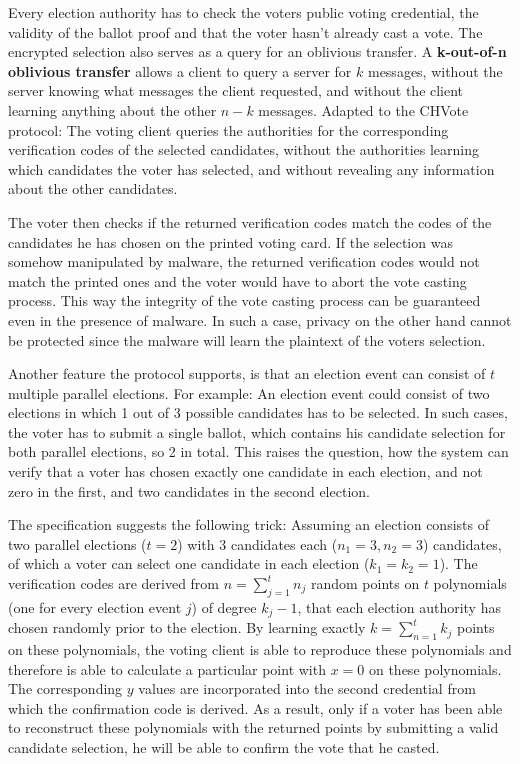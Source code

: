 Every election authority has to check the voters public voting credential, the validity of the ballot proof and that the voter hasn't already cast a vote. The encrypted selection also serves as a query for an oblivious transfer. A \textbf{k-out-of-n oblivious transfer} allows a client to query a server for $k$ messages, without the server knowing what messages the client requested, and without the client learning anything about the other $n-k$ messages. Adapted to the CHVote protocol: The voting client queries the authorities for the corresponding verification codes of the selected candidates, without the authorities learning which candidates the voter has selected, and without revealing any information about the other candidates. 

The voter then checks if the returned verification codes match the codes of the candidates he has chosen on the printed voting card. If the selection was somehow manipulated by malware, the returned verification codes would not match the printed ones and the voter would have to abort the vote casting process. This way the integrity of the vote casting process can be guaranteed even in the presence of malware. In such a case, privacy on the other hand cannot be protected since the malware will learn the plaintext of the voters selection.

Another feature the protocol supports, is that an election event can consist of $t$ multiple parallel elections. For example: An election event could consist of two elections in which 1 out of 3 possible candidates has to be selected. In such cases, the voter has to submit a single ballot, which contains his candidate selection for both parallel elections, so 2 in total. This raises the question, how the system can verify that a voter has chosen exactly one candidate in each election, and not zero in the first, and two candidates in the second election.

The specification suggests the following trick: Assuming an election consists of two parallel elections ($t=2$) with 3 candidates each ($n_1 = 3, n_2 = 3$) candidates, of which a voter can select one candidate in each election ($k_1 = k_2 =1$). The verification codes are derived from $n = \sum_{j=1}^{t} n_j$ random points on $t$ polynomials (one for every election event $j$) of degree $k_j - 1$, that each election authority has chosen randomly prior to the election. By learning exactly $k = \sum_{n=1}^{t} k_j$ points on these polynomials, the voting client is able to reproduce these polynomials and therefore is able to calculate a particular point with $x=0$ on these polynomials. The corresponding $y$ values are incorporated into the second credential from which the confirmation code is derived. As a result, only if a voter has been able to reconstruct these polynomials with the returned points by submitting a valid candidate selection, he will be able to confirm the vote that he casted.

